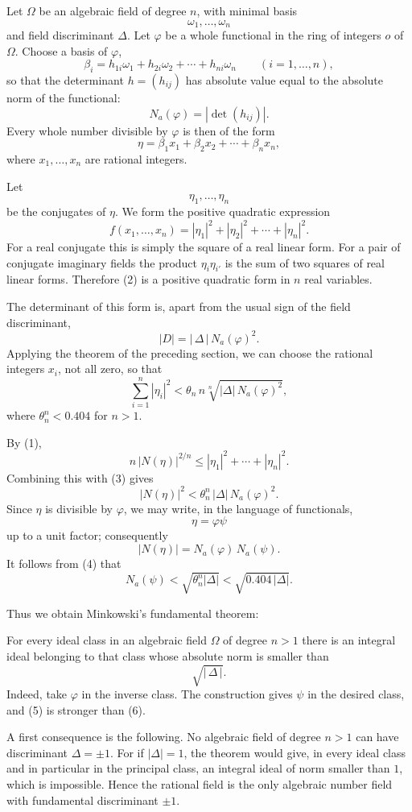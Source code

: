 \documentclass[11pt,a4paper]{book}
\begin{document}
Let \(\Omega\) be an algebraic field of degree \(n\), with minimal basis
\[
  \omega_1,\ldots,\omega_n
\]
and field discriminant \(\Delta\).  Let \(\varphi\) be a whole functional in the ring of integers \(o\) of \(\Omega\).  Choose a basis of \(\varphi\),
\[
  \beta_i=h_{1i}\omega_1+h_{2i}\omega_2+\cdots+h_{ni}\omega_n
  \qquad (i=1,\ldots,n),
\]
so that the determinant \(h=(h_{ij})\) has absolute value equal to the absolute norm of the functional:
\[
  N_a(\varphi)=|\det(h_{ij})|.
\]
Every whole number divisible by \(\varphi\) is then of the form
\[
  \eta=\beta_1x_1+\beta_2x_2+\cdots+\beta_nx_n,
\]
where \(x_1,\ldots,x_n\) are rational integers.

Let
\[
  \eta_1,\ldots,\eta_n
\]
be the conjugates of \(\eta\).  We form the positive quadratic expression
\[
  f(x_1,\ldots,x_n)=|\eta_1|^2+|\eta_2|^2+\cdots+|\eta_n|^2.
\tag{2}
\]
For a real conjugate this is simply the square of a real linear form.  For a pair of conjugate imaginary fields the product \(\eta_i\eta_{i'}\) is the sum of two squares of real linear forms.  Therefore (2) is a positive quadratic form in \(n\) real variables.

The determinant of this form is, apart from the usual sign of the field discriminant,
\[
  |D|=|\,\Delta\,|\,N_a(\varphi)^2.
\]
Applying the theorem of the preceding section, we can choose the rational integers \(x_i\), not all zero, so that
\[
  \sum_{i=1}^{n}|\eta_i|^2
    <\theta_n\,n\sqrt[n]{|\Delta|\,N_a(\varphi)^2},
\tag{3}
\]
where \(\theta_n^n<0.404\) for \(n>1\).

By (1),
\[
  n\,|N(\eta)|^{2/n}
     \le |\eta_1|^2+\cdots+|\eta_n|^2.
\]
Combining this with (3) gives
\[
  |N(\eta)|^2
    <\theta_n^n\,|\Delta|\,N_a(\varphi)^2.
\tag{4}
\]
Since \(\eta\) is divisible by \(\varphi\), we may write, in the language of functionals,
\[
  \eta=\varphi\psi
\]
up to a unit factor; consequently
\[
  |N(\eta)|=N_a(\varphi)\,N_a(\psi).
\]
It follows from (4) that
\[
  N_a(\psi)<\sqrt{\theta_n^n|\Delta|}<\sqrt{0.404\,|\Delta|}.
\tag{5}
\]

Thus we obtain Minkowski's fundamental theorem:

For every ideal class in an algebraic field \(\Omega\) of degree \(n>1\) there is an integral ideal belonging to that class whose absolute norm is smaller than
\[
  \sqrt{|\,\Delta\,|}.
\tag{6}
\]
Indeed, take \(\varphi\) in the inverse class.  The construction gives \(\psi\) in the desired class, and (5) is stronger than (6).

A first consequence is the following.  No algebraic field of degree \(n>1\) can have discriminant \(\Delta=\pm1\).  For if \(|\Delta|=1\), the theorem would give, in every ideal class and in particular in the principal class, an integral ideal of norm smaller than \(1\), which is impossible.  Hence the rational field is the only algebraic number field with fundamental discriminant \(\pm1\).
\end{document}
